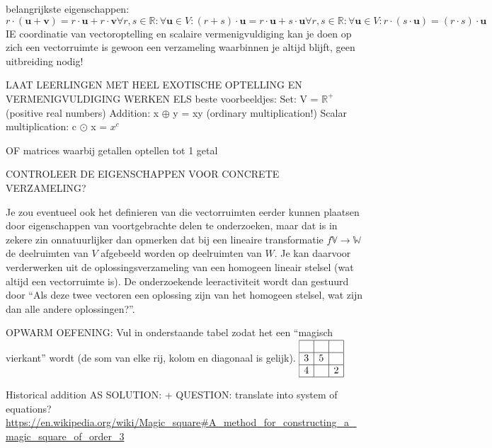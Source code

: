 \documentclass{ximera}
\begin{document}
\author{Alexander Holvoet}

belangrijkste eigenschappen:
$$
r\cdot (\mathbf{u}+\mathbf{v})=r\cdot \mathbf{u}+r\cdot \mathbf{v}
\forall r,s\in \mathbb{R}:\forall \mathbf{u} \in V:(r+s)\cdot \mathbf{u}=r\cdot \mathbf{u}+s \cdot \mathbf{u}
\forall r,s\in \mathbb{R}:\forall \mathbf{u} \in V:r\cdot (s\cdot \mathbf{u})=(r\cdot s) \cdot \mathbf{u}
$$
IE coordinatie van vectoroptelling en scalaire vermenigvuldiging
kan je doen op zich
een vectorruimte is gewoon een verzameling waarbinnen je altijd blijft, geen uitbreiding nodig!

LAAT LEERLINGEN MET HEEL EXOTISCHE OPTELLING EN VERMENIGVULDIGING WERKEN
ELS beste voorbeeldjes:
Set: V = $\mathbb{R}^{+}$ (positive real numbers)
Addition: x $\oplus$ y = xy (ordinary multiplication!)
Scalar multiplication: c $\odot$ x = $x^c$

OF matrices waarbij getallen optellen tot 1 getal


CONTROLEER DE EIGENSCHAPPEN VOOR CONCRETE VERZAMELING?


Je zou eventueel ook het definieren van die vectorruimten eerder kunnen plaatsen door eigenschappen van voortgebrachte delen te onderzoeken, maar dat is in zekere zin onnatuurlijker dan opmerken dat bij een lineaire transformatie \(f \mathbb{V} \to \mathbb{W}\) de deelruimten van \(V\) afgebeeld worden op deelruimten van \(W\).
Je kan daarvoor verderwerken uit de oplossingsverzameling van een homogeen lineair stelsel (wat altijd een vectorruimte is).
De onderzoekende leeractiviteit wordt dan gestuurd door ``Als deze twee vectoren een oplossing zijn van het homogeen stelsel, wat zijn dan alle andere oplossingen?''.

OPWARM OEFENING:
Vul in onderstaande tabel zodat het een ``magisch vierkant'' wordt (de som van elke rij, kolom en diagonaal is gelijk).
\(
\begin{array}{|c|c|c|}
\hline
 &  &  \\
\hline
3 & 5 &  \\
\hline
4 &  & 2 \\
\hline
\end{array}
\)

Historical addition AS SOLUTION: + QUESTION: translate into system of equations?
\url{https://en.wikipedia.org/wiki/Magic_square#A_method_for_constructing_a_magic_square_of_order_3}
\end{document}
